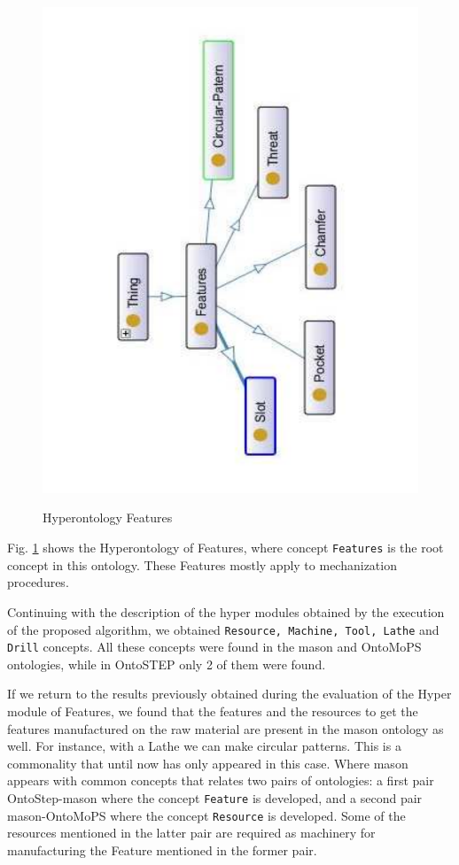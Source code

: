 \begin{figure}
\begin{minipage}{.50\textwidth}
		\includegraphics[scale=0.35, angle=270]{figure-chapterIV/fig4-23}\\
		\caption{Hyperontology Features}
		\label{figure4-23}
	\end{minipage}%
\end{figure}



Fig. \ref{figure4-23} shows the Hyperontology of Features, where concept \texttt{Features} is the  root concept in this ontology. These Features mostly apply to mechanization procedures. 




Continuing with the description of the hyper modules obtained by the execution of the proposed algorithm, we obtained \texttt{Resource, Machine, Tool, Lathe} and \texttt{Drill} concepts. All these concepts were  found in the \gls{mason} and OntoMoPS ontologies, while in OntoSTEP only 2 of them were found. 

If we return to the results previously obtained during the evaluation of the Hyper module of Features, we found that the features and the resources to get the features manufactured on the raw material are present in the \gls{mason} ontology as well. For instance, with a Lathe we can make circular patterns. This is a commonality that until now has only appeared in this case. Where \gls{mason} appears with common concepts that relates two pairs of ontologies: a first pair OntoStep-\gls{mason} where the concept \texttt{Feature} is developed, and a second pair \gls{mason}-OntoMoPS where the concept \texttt{Resource} is developed. Some of the resources mentioned in the latter pair are required as machinery for manufacturing the Feature mentioned in the former pair. 

